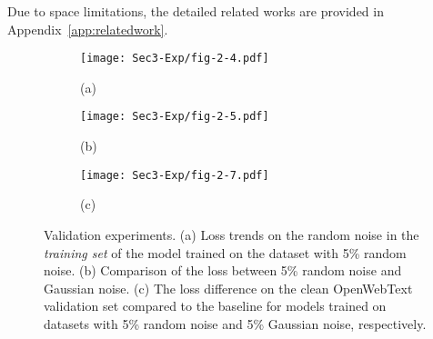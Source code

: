 Due to space limitations, the detailed related works are provided in Appendix~\ref{app:relatedwork}.


\begin{figure*}[ht]
  \centering
  \begin{subfigure}{0.31\linewidth}
    \texttt{[image: Sec3-Exp/fig-2-4.pdf]}
    \caption*{(a)}
  \end{subfigure} \hfill
  \begin{subfigure}{0.31\linewidth}
    \texttt{[image: Sec3-Exp/fig-2-5.pdf]}
    \caption*{(b)}
  \end{subfigure} \hfill
  \begin{subfigure}{0.33\linewidth}
    \texttt{[image: Sec3-Exp/fig-2-7.pdf]}
    \caption*{(c)}
  \end{subfigure}
  \vspace*{-2.5mm}
  \caption{Validation experiments.  (a) Loss trends on the random noise in the \textit{training set} of the model trained on the dataset with 5\% random noise. (b) Comparison of the loss between 5\% random noise and Gaussian noise. (c) The loss difference on the clean OpenWebText validation set compared to the baseline for models trained on datasets with 5\% random noise and 5\% Gaussian noise, respectively.}
  \label{fig:3}
  \vspace*{-4mm}
\end{figure*}